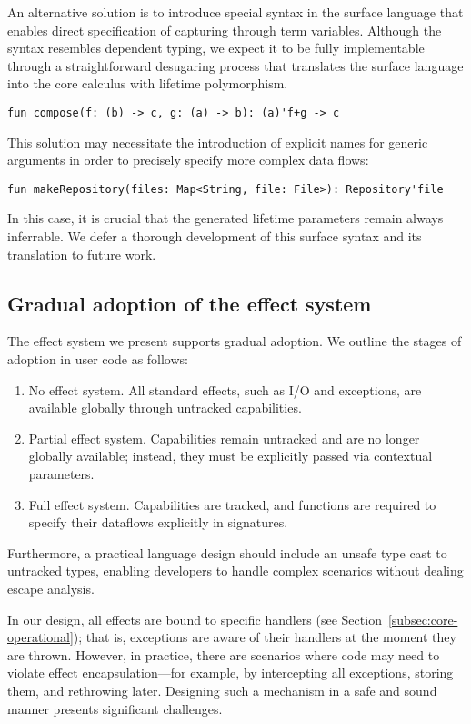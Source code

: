 \documentclass[acmsmall,review,screen]{acmart}
\begin{document}
An alternative solution is to introduce special syntax in the surface language that enables direct specification of capturing through term variables.
Although the syntax resembles dependent typing, we expect it to be fully implementable through a straightforward desugaring process that translates the surface language into the core calculus with lifetime polymorphism.
\begin{lstlisting}[language=colang]
    fun compose(f: (b) -> c, g: (a) -> b): (a)'f+g -> c
\end{lstlisting}

This solution may necessitate the introduction of explicit names for generic arguments in order to precisely specify more complex data flows:
\begin{lstlisting}[language=colang]
    fun makeRepository(files: Map<String, file: File>): Repository'file
\end{lstlisting}

In this case, it is crucial that the generated lifetime parameters remain always inferrable.
We defer a thorough development of this surface syntax and its translation to future work.

\subsection{Gradual adoption of the effect system}

The effect system we present supports gradual adoption.
We outline the stages of adoption in user code as follows:
\begin{enumerate}
    \item No effect system.
    All standard effects, such as I/O and exceptions, are available globally through untracked capabilities.
    \item Partial effect system.
    Capabilities remain untracked and are no longer globally available; instead, they must be explicitly passed via contextual parameters.
    \item Full effect system.
    Capabilities are tracked, and functions are required to specify their dataflows explicitly in signatures.
\end{enumerate}

Furthermore, a practical language design should include an unsafe type cast to untracked types, enabling developers to handle complex scenarios without dealing escape analysis.

In our design, all effects are bound to specific handlers (see Section~\ref{subsec:core-operational}); that is, exceptions are aware of their handlers at the moment they are thrown.
However, in practice, there are scenarios where code may need to violate effect encapsulation—for example, by intercepting all exceptions, storing them,
 and rethrowing later.
Designing such a mechanism in a safe and sound manner presents significant challenges.
\end{document}
